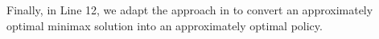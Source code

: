 \documentclass[12pt]{article}
\begin{document}
Finally, in Line 12, we adapt the approach in \cite{jin2020efficiently} to convert an approximately optimal minimax solution into an approximately optimal policy.




\end{document}
